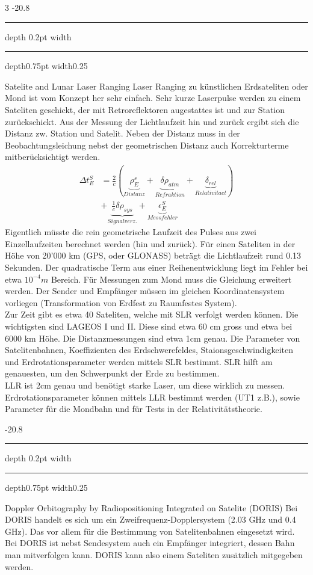 \documentclass[9pt, landscape, fleqn]{scrartcl}
\makeatletter
\renewcommand{\subsection}{\@startsection{subsection}{1}{0mm}%
{-2\baselineskip}{0.8\baselineskip}%
{\hrule depth 0.2pt width\columnwidth\hrule depth0.75pt
width0.25\columnwidth\vspace*{1.2em}\large\bfseries\rmfamily}}
\makeatother
\begin{document}
\begin{multicols*}{3}
\subsection{Satelite and Lunar Laser Ranging}
Laser Ranging zu künstlichen Erdsateliten oder Mond ist vom Konzept her sehr einfach. Sehr kurze Laserpulse werden zu einem Sateliten geschickt, der mit Retroreflektoren augestattes ist und zur Station zurückschickt. Aus der Messung der Lichtlaufzeit hin und zurück ergibt sich die Distanz zw. Station und Satelit. Neben der Distanz muss in der Beobachtungsleichung nebst der geometrischen Distanz auch Korrekturterme mitberücksichtigt werden.
\begin{align*}
    \Delta t_E^S &= \frac{2}{c}\left( \underbrace{\rho_E^s}_{Distanz} + \underbrace{\delta \rho_{atm}}_{Refraktion} + \underbrace{\delta_{rel}}_{Relativitaet} \right)  \\
    &+ \underbrace{\frac{1}{c} \delta \rho_{sys}}_{Signalverz.}+ \underbrace{\epsilon_E^S}_{Messfehler}
\end{align*}
Eigentlich müsste die rein geometrische Laufzeit des Pulses aus zwei Einzellaufzeiten berechnet werden (hin und zurück). Für einen Sateliten in der Höhe von 20'000 km (GPS, oder GLONASS) beträgt die Lichtlaufzeit rund 0.13 Sekunden. Der quadratische Term aus einer Reihenentwicklung liegt im Fehler bei etwa $10^{-4}m$ Bereich. Für Messungen zum Mond muss die Gleichung erweitert werden. Der Sender und Empfänger müssen im gleichen Koordinatensystem vorliegen (Transformation von Erdfest zu Raumfestes System). \\

Zur Zeit gibt es etwa 40 Sateliten, welche mit SLR verfolgt werden können. Die wichtigsten sind LAGEOS I und II. Diese sind etwa 60 cm gross und etwa bei 6000 km Höhe. Die Distanzmessungen sind etwa 1cm genau. Die Parameter von Satelitenbahnen, Koeffizienten des Erdschwerefeldes, Staionsgeschwindigkeiten und Erdrotationsparameter werden mittels SLR bestimmt. SLR hilft am genauesten, um den Schwerpunkt der Erde zu bestimmen. \\

LLR ist 2cm genau und benötigt starke Laser, um diese wirklich zu messen. Erdrotationsparameter können mittels LLR bestimmt werden (UT1 z.B.), sowie Parameter für die Mondbahn und für Tests in der Relativitätstheorie.

\subsection{Doppler Orbitography by Radiopositioning Integrated on Satelite (DORIS)}
Bei DORIS handelt es sich um ein Zweifrequenz-Dopplersystem (2.03 GHz und 0.4 GHz). Das vor allem für die Bestimmung von Satelitenbahnen eingesetzt wird. Bei DORIS ist nebst Sendesystem auch ein Empfänger integriert, dessen Bahn man mitverfolgen kann. DORIS kann also einem Sateliten zusätzlich mitgegeben werden. \\


\end{multicols*}
\end{document}
